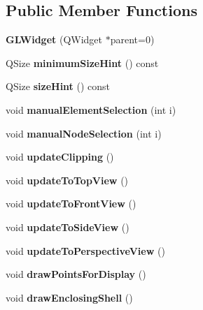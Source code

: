 \subsection*{Public Member Functions}
\begin{DoxyCompactItemize}
\item 
\hypertarget{classGLWidget_ab79c391c86de1ffb76f6950b49d82c0c}{}{\bfseries G\+L\+Widget} (Q\+Widget $\ast$parent=0)\label{classGLWidget_ab79c391c86de1ffb76f6950b49d82c0c}

\item 
\hypertarget{classGLWidget_ade3142625c1bfda0576e419b176cf8b1}{}Q\+Size {\bfseries minimum\+Size\+Hint} () const \label{classGLWidget_ade3142625c1bfda0576e419b176cf8b1}

\item 
\hypertarget{classGLWidget_a57698bc426052845b43a135a13540154}{}Q\+Size {\bfseries size\+Hint} () const \label{classGLWidget_a57698bc426052845b43a135a13540154}

\item 
\hypertarget{classGLWidget_ad425870ac081f6814c5bdb794e6e4c21}{}void {\bfseries manual\+Element\+Selection} (int i)\label{classGLWidget_ad425870ac081f6814c5bdb794e6e4c21}

\item 
\hypertarget{classGLWidget_a21f7a00a668f6ab6c5a9b1491e30c43e}{}void {\bfseries manual\+Node\+Selection} (int i)\label{classGLWidget_a21f7a00a668f6ab6c5a9b1491e30c43e}

\item 
\hypertarget{classGLWidget_ad569f9af7f5bbbfee5f1810d07107f20}{}void {\bfseries update\+Clipping} ()\label{classGLWidget_ad569f9af7f5bbbfee5f1810d07107f20}

\item 
\hypertarget{classGLWidget_adf09146230a2acda5a955acf59fbc653}{}void {\bfseries update\+To\+Top\+View} ()\label{classGLWidget_adf09146230a2acda5a955acf59fbc653}

\item 
\hypertarget{classGLWidget_ab4dcb3e931649a5f1edb6c6cede31075}{}void {\bfseries update\+To\+Front\+View} ()\label{classGLWidget_ab4dcb3e931649a5f1edb6c6cede31075}

\item 
\hypertarget{classGLWidget_a4930d77748cd175e349194da489c12d5}{}void {\bfseries update\+To\+Side\+View} ()\label{classGLWidget_a4930d77748cd175e349194da489c12d5}

\item 
\hypertarget{classGLWidget_afa3014a464a473c9ba62b22720f2d6fd}{}void {\bfseries update\+To\+Perspective\+View} ()\label{classGLWidget_afa3014a464a473c9ba62b22720f2d6fd}

\item 
\hypertarget{classGLWidget_af9b7537315485a04dd848ee62ac60b1e}{}void {\bfseries draw\+Points\+For\+Display} ()\label{classGLWidget_af9b7537315485a04dd848ee62ac60b1e}

\item 
\hypertarget{classGLWidget_ae613db32ea14ed70eeec575a9edf2398}{}void {\bfseries draw\+Enclosing\+Shell} ()\label{classGLWidget_ae613db32ea14ed70eeec575a9edf2398}

\end{DoxyCompactItemize}
